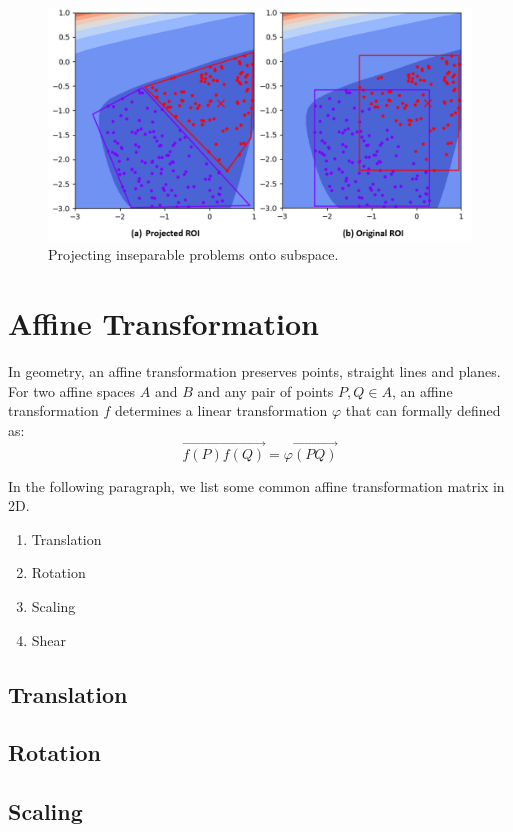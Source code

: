 \begin{figure}
\centering
\includegraphics[width=\textwidth]{Projected_ROI}
\caption{Projecting inseparable problems onto subspace.}\label{fig:Projected_ROI}
\end{figure}



\section{Affine Transformation}
In geometry, an affine transformation preserves points, straight lines and planes.
For two affine spaces $A$ and $B$ and any pair of points $P, Q \in A$,
an affine transformation $f$ determines a linear transformation $\varphi$ that can formally defined as:
\begin{displaymath}
\overrightarrow{f(P)f(Q)} = \varphi \overrightarrow{(PQ)}
\end{displaymath}

In the following paragraph, we list some common affine transformation matrix in 2D.
\begin{enumerate}
    \item Translation 
    \item Rotation 
    \item Scaling 
    \item Shear 
\end{enumerate} 

\subsection{Translation}
\subsection{Rotation}
\subsection{Scaling}
